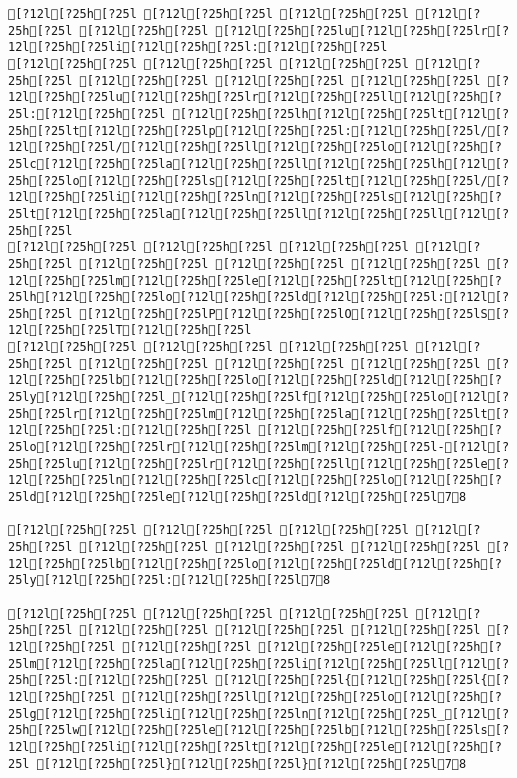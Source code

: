 \documentclass{scrartcl}
\begin{document}
\begin{Verbatim}
[?12l[?25h[?25l [?12l[?25h[?25l [?12l[?25h[?25l [?12l[?25h[?25l [?12l[?25h[?25l [?12l[?25h[?25lu[?12l[?25h[?25lr[?12l[?25h[?25li[?12l[?25h[?25l:[?12l[?25h[?25l
[?12l[?25h[?25l [?12l[?25h[?25l [?12l[?25h[?25l [?12l[?25h[?25l [?12l[?25h[?25l [?12l[?25h[?25l [?12l[?25h[?25l [?12l[?25h[?25lu[?12l[?25h[?25lr[?12l[?25h[?25ll[?12l[?25h[?25l:[?12l[?25h[?25l [?12l[?25h[?25lh[?12l[?25h[?25lt[?12l[?25h[?25lt[?12l[?25h[?25lp[?12l[?25h[?25l:[?12l[?25h[?25l/[?12l[?25h[?25l/[?12l[?25h[?25ll[?12l[?25h[?25lo[?12l[?25h[?25lc[?12l[?25h[?25la[?12l[?25h[?25ll[?12l[?25h[?25lh[?12l[?25h[?25lo[?12l[?25h[?25ls[?12l[?25h[?25lt[?12l[?25h[?25l/[?12l[?25h[?25li[?12l[?25h[?25ln[?12l[?25h[?25ls[?12l[?25h[?25lt[?12l[?25h[?25la[?12l[?25h[?25ll[?12l[?25h[?25ll[?12l[?25h[?25l
[?12l[?25h[?25l [?12l[?25h[?25l [?12l[?25h[?25l [?12l[?25h[?25l [?12l[?25h[?25l [?12l[?25h[?25l [?12l[?25h[?25l [?12l[?25h[?25lm[?12l[?25h[?25le[?12l[?25h[?25lt[?12l[?25h[?25lh[?12l[?25h[?25lo[?12l[?25h[?25ld[?12l[?25h[?25l:[?12l[?25h[?25l [?12l[?25h[?25lP[?12l[?25h[?25lO[?12l[?25h[?25lS[?12l[?25h[?25lT[?12l[?25h[?25l
[?12l[?25h[?25l [?12l[?25h[?25l [?12l[?25h[?25l [?12l[?25h[?25l [?12l[?25h[?25l [?12l[?25h[?25l [?12l[?25h[?25l [?12l[?25h[?25lb[?12l[?25h[?25lo[?12l[?25h[?25ld[?12l[?25h[?25ly[?12l[?25h[?25l_[?12l[?25h[?25lf[?12l[?25h[?25lo[?12l[?25h[?25lr[?12l[?25h[?25lm[?12l[?25h[?25la[?12l[?25h[?25lt[?12l[?25h[?25l:[?12l[?25h[?25l [?12l[?25h[?25lf[?12l[?25h[?25lo[?12l[?25h[?25lr[?12l[?25h[?25lm[?12l[?25h[?25l-[?12l[?25h[?25lu[?12l[?25h[?25lr[?12l[?25h[?25ll[?12l[?25h[?25le[?12l[?25h[?25ln[?12l[?25h[?25lc[?12l[?25h[?25lo[?12l[?25h[?25ld[?12l[?25h[?25le[?12l[?25h[?25ld[?12l[?25h[?25l78

[?12l[?25h[?25l [?12l[?25h[?25l [?12l[?25h[?25l [?12l[?25h[?25l [?12l[?25h[?25l [?12l[?25h[?25l [?12l[?25h[?25l [?12l[?25h[?25lb[?12l[?25h[?25lo[?12l[?25h[?25ld[?12l[?25h[?25ly[?12l[?25h[?25l:[?12l[?25h[?25l78

[?12l[?25h[?25l [?12l[?25h[?25l [?12l[?25h[?25l [?12l[?25h[?25l [?12l[?25h[?25l [?12l[?25h[?25l [?12l[?25h[?25l [?12l[?25h[?25l [?12l[?25h[?25l [?12l[?25h[?25le[?12l[?25h[?25lm[?12l[?25h[?25la[?12l[?25h[?25li[?12l[?25h[?25ll[?12l[?25h[?25l:[?12l[?25h[?25l [?12l[?25h[?25l{[?12l[?25h[?25l{[?12l[?25h[?25l [?12l[?25h[?25ll[?12l[?25h[?25lo[?12l[?25h[?25lg[?12l[?25h[?25li[?12l[?25h[?25ln[?12l[?25h[?25l_[?12l[?25h[?25lw[?12l[?25h[?25le[?12l[?25h[?25lb[?12l[?25h[?25ls[?12l[?25h[?25li[?12l[?25h[?25lt[?12l[?25h[?25le[?12l[?25h[?25l [?12l[?25h[?25l}[?12l[?25h[?25l}[?12l[?25h[?25l78


\end{Verbatim}
\end{document}
